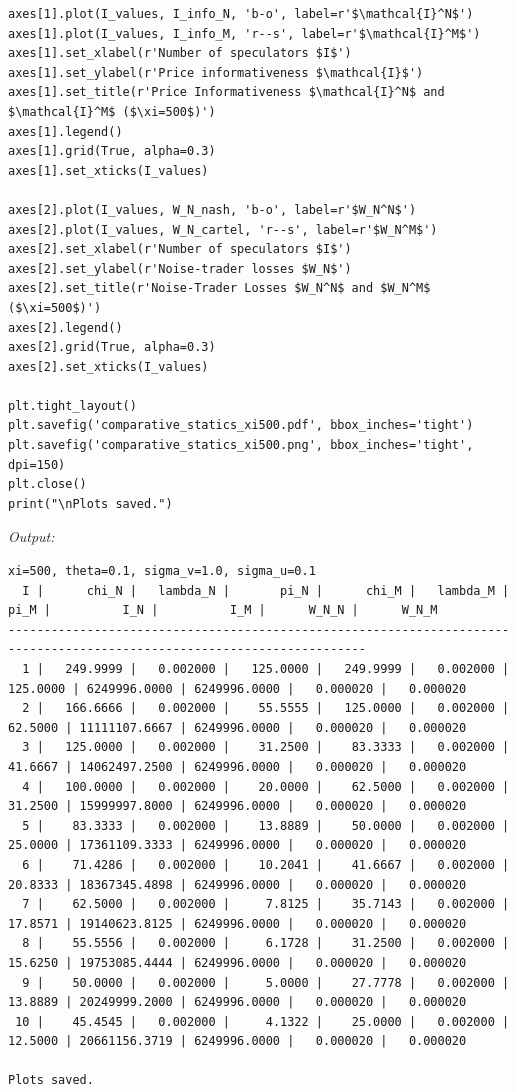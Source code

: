 \begin{lstlisting}[style=pythonstyle]
axes[1].plot(I_values, I_info_N, 'b-o', label=r'$\mathcal{I}^N$')
axes[1].plot(I_values, I_info_M, 'r--s', label=r'$\mathcal{I}^M$')
axes[1].set_xlabel(r'Number of speculators $I$')
axes[1].set_ylabel(r'Price informativeness $\mathcal{I}$')
axes[1].set_title(r'Price Informativeness $\mathcal{I}^N$ and $\mathcal{I}^M$ ($\xi=500$)')
axes[1].legend()
axes[1].grid(True, alpha=0.3)
axes[1].set_xticks(I_values)

axes[2].plot(I_values, W_N_nash, 'b-o', label=r'$W_N^N$')
axes[2].plot(I_values, W_N_cartel, 'r--s', label=r'$W_N^M$')
axes[2].set_xlabel(r'Number of speculators $I$')
axes[2].set_ylabel(r'Noise-trader losses $W_N$')
axes[2].set_title(r'Noise-Trader Losses $W_N^N$ and $W_N^M$ ($\xi=500$)')
axes[2].legend()
axes[2].grid(True, alpha=0.3)
axes[2].set_xticks(I_values)

plt.tight_layout()
plt.savefig('comparative_statics_xi500.pdf', bbox_inches='tight')
plt.savefig('comparative_statics_xi500.png', bbox_inches='tight', dpi=150)
plt.close()
print("\nPlots saved.")
\end{lstlisting}

\noindent\textit{Output:}
\begin{lstlisting}[style=outputstyle]
xi=500, theta=0.1, sigma_v=1.0, sigma_u=0.1
  I |      chi_N |   lambda_N |       pi_N |      chi_M |   lambda_M |       pi_M |          I_N |          I_M |      W_N_N |      W_N_M
------------------------------------------------------------------------------------------------------------------------
  1 |   249.9999 |   0.002000 |   125.0000 |   249.9999 |   0.002000 |   125.0000 | 6249996.0000 | 6249996.0000 |   0.000020 |   0.000020
  2 |   166.6666 |   0.002000 |    55.5555 |   125.0000 |   0.002000 |    62.5000 | 11111107.6667 | 6249996.0000 |   0.000020 |   0.000020
  3 |   125.0000 |   0.002000 |    31.2500 |    83.3333 |   0.002000 |    41.6667 | 14062497.2500 | 6249996.0000 |   0.000020 |   0.000020
  4 |   100.0000 |   0.002000 |    20.0000 |    62.5000 |   0.002000 |    31.2500 | 15999997.8000 | 6249996.0000 |   0.000020 |   0.000020
  5 |    83.3333 |   0.002000 |    13.8889 |    50.0000 |   0.002000 |    25.0000 | 17361109.3333 | 6249996.0000 |   0.000020 |   0.000020
  6 |    71.4286 |   0.002000 |    10.2041 |    41.6667 |   0.002000 |    20.8333 | 18367345.4898 | 6249996.0000 |   0.000020 |   0.000020
  7 |    62.5000 |   0.002000 |     7.8125 |    35.7143 |   0.002000 |    17.8571 | 19140623.8125 | 6249996.0000 |   0.000020 |   0.000020
  8 |    55.5556 |   0.002000 |     6.1728 |    31.2500 |   0.002000 |    15.6250 | 19753085.4444 | 6249996.0000 |   0.000020 |   0.000020
  9 |    50.0000 |   0.002000 |     5.0000 |    27.7778 |   0.002000 |    13.8889 | 20249999.2000 | 6249996.0000 |   0.000020 |   0.000020
 10 |    45.4545 |   0.002000 |     4.1322 |    25.0000 |   0.002000 |    12.5000 | 20661156.3719 | 6249996.0000 |   0.000020 |   0.000020

Plots saved.
\end{lstlisting}

